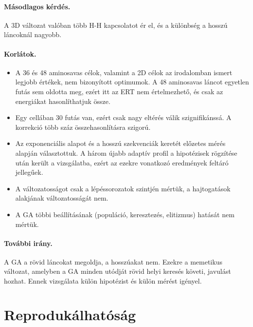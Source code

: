 \documentclass[11pt,a4paper]{article}
\begin{document}
\paragraph{Másodlagos kérdés.} A 3D változat valóban több H-H kapcsolatot ér el, és
a különbség a hosszú láncoknál nagyobb.

\paragraph{Korlátok.}
\begin{itemize}
\item A 36 és 48 aminosavas célok, valamint a 2D célok az irodalomban ismert
legjobb értékek, nem bizonyított optimumok. A 48 aminosavas láncot egyetlen futás
sem oldotta meg, ezért itt az ERT nem értelmezhető, és csak az energiákat
hasonlíthatjuk össze.
\item Egy cellában 30 futás van, ezért csak nagy eltérés válik szignifikánssá. A
korrekció több száz összehasonlításra szigorú.
\item Az exponenciális alapot és a hosszú szekvenciák keretét előzetes mérés
alapján választottuk. A három újabb adaptív profil a hipotézisek rögzítése után került
a vizsgálatba, ezért az ezekre vonatkozó eredmények feltáró jellegűek.
\item A változatosságot csak a lépéssorozatok szintjén mértük, a hajtogatások
alakjának változatosságát nem.
\item A GA többi beállításának (populáció, keresztezés, elitizmus) hatását nem
mértük.
\end{itemize}

\paragraph{További irány.} A GA a rövid láncokat megoldja, a hosszúakat nem.
Ezekre a memetikus változat, amelyben a GA minden utódját rövid helyi keresés
követi, javulást hozhat. Ennek vizsgálata külön hipotézist és külön mérést
igényel.

\clearpage
\section{Reprodukálhatóság}
\end{document}
